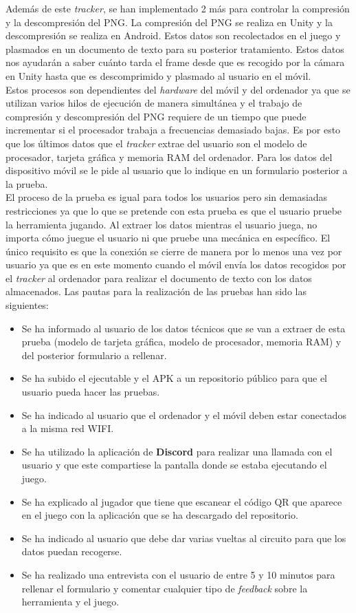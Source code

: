 Adem\'as de este \textit{tracker}, se han implementado 2 m\'as para controlar la compresi\'on y la descompresi\'on del PNG. La compresi\'on del PNG se realiza en Unity y la descompresi\'on se realiza en Android. Estos datos son recolectados en el juego y plasmados en un documento de texto para su posterior tratamiento. Estos datos nos ayudar\'an a saber cu\'anto tarda el frame desde que es recogido por la c\'amara en Unity hasta que es descomprimido y plasmado al usuario en el m\'ovil. \\

Estos procesos son dependientes del \textit{hardware} del m\'ovil y del ordenador ya que se utilizan varios hilos de ejecuci\'on de manera simult\'anea y el trabajo de compresi\'on y descompresi\'on del PNG requiere de un tiempo que puede incrementar si el procesador trabaja a frecuencias demasiado bajas. Es por esto que los \'ultimos datos que el \textit{tracker} extrae del usuario son el modelo de procesador, tarjeta gr\'afica y memoria RAM del ordenador. Para los datos del dispositivo m\'ovil se le pide al usuario que lo indique en un formulario posterior a la prueba.\\

El proceso de la prueba es igual para todos los usuarios pero sin demasiadas restricciones ya que lo que se pretende con esta prueba es que el usuario pruebe la herramienta jugando. Al extraer los datos mientras el usuario juega, no importa c\'omo juegue el usuario ni que pruebe una mec\'anica en espec\'ifico. El \'unico requisito es que la conexi\'on se cierre de manera por lo menos una vez por usuario ya que es en este momento cuando el m\'ovil env\'ia los datos recogidos por el \textit{tracker} al ordenador para realizar el documento de texto con los datos almacenados. Las pautas para la realizaci\'on de las pruebas han sido las siguientes:

\begin {itemize}
\item Se ha informado al usuario de los datos t\'ecnicos que se van a extraer de esta prueba (modelo de tarjeta gr\'afica, modelo de procesador, memoria RAM) y del posterior formulario a rellenar.
\item Se ha subido el ejecutable y el APK a un repositorio p\'ublico para que el usuario pueda hacer las pruebas.
\item Se ha indicado al usuario que el ordenador y el m\'ovil deben estar conectados a la misma red WIFI.
\item Se ha utilizado la aplicaci\'on de \textbf{Discord} para realizar una llamada con el usuario y que este compartiese la pantalla donde se estaba ejecutando el juego.
\item Se ha explicado al jugador que tiene que escanear el c\'odigo QR que aparece en el juego con la aplicaci\'on que se ha descargado del repositorio.
\item Se ha indicado al usuario que debe dar varias vueltas al circuito para que los datos puedan recogerse. 
\item Se ha realizado una entrevista con el usuario de entre 5 y 10 minutos para rellenar el formulario y comentar cualquier tipo de \textit{feedback} sobre la herramienta y el juego.
\end {itemize}

